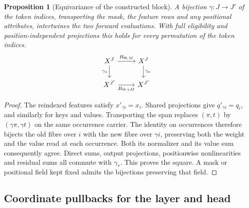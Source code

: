 \documentclass[11pt,a4paper]{article}
\newtheorem{proposition}[proposition]{Proposition}
\theoremstyle{definition}
\theoremstyle{remark}\newaliascnt{remark}{theorem}
\numberwithin{equation}{section}
\begin{document}
\begin{proposition}[Equivariance of the constructed block]
A bijection \(\gamma:J\to J'\) of the token indices, transporting the mask, the feature rows and any positional attributes, intertwines the two forward evaluations. With full eligibility and position-independent projections this holds for every permutation of the token indices.
\[
\begin{tikzcd}
 X^J\arrow[r,"B_{\Theta,M}"]\arrow[d,"\gamma_*"']&
 X^J\arrow[d,"\gamma_*"]\\
 X^{J'}\arrow[r,"B_{\Theta,\gamma M}"']&X^{J'}
\end{tikzcd}
\]
\end{proposition}
\begin{proof}
The reindexed features satisfy \(x'_{\gamma i}=x_i\). Shared projections give \(q'_{\gamma i}=q_i\), and similarly for keys and values. Transporting the span replaces $(\pi,t)$ by $(\gamma\pi,\gamma t)$ on the same occurrence carrier. The identity on occurrences therefore bijects the old fibre over $i$ with the new fibre over $\gamma i$, preserving both the weight and the value read at each occurrence. Both its normalizer and its value sum consequently agree. Direct sums, output projections, positionwise nonlinearities and residual sums all commute with \(\gamma_*\). This proves the square. A mask or positional field kept fixed admits the bijections preserving that field.
\end{proof}

\subsection{Coordinate pullbacks for the layer and head}
\end{document}
